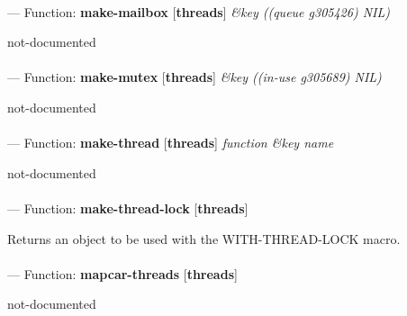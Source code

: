 \paragraph{}
\label{THREADS:MAKE-MAILBOX}
--- Function: \textbf{make-mailbox} [\textbf{threads}] \textit{\&key ((queue g305426) NIL)}

\begin{adjustwidth}{5em}{5em}
not-documented
\end{adjustwidth}

\paragraph{}
\label{THREADS:MAKE-MUTEX}
--- Function: \textbf{make-mutex} [\textbf{threads}] \textit{\&key ((in-use g305689) NIL)}

\begin{adjustwidth}{5em}{5em}
not-documented
\end{adjustwidth}

\paragraph{}
\label{THREADS:MAKE-THREAD}
--- Function: \textbf{make-thread} [\textbf{threads}] \textit{function \&key name}

\begin{adjustwidth}{5em}{5em}
not-documented
\end{adjustwidth}

\paragraph{}
\label{THREADS:MAKE-THREAD-LOCK}
--- Function: \textbf{make-thread-lock} [\textbf{threads}] \textit{}

\begin{adjustwidth}{5em}{5em}
Returns an object to be used with the WITH-THREAD-LOCK macro.
\end{adjustwidth}

\paragraph{}
\label{THREADS:MAPCAR-THREADS}
--- Function: \textbf{mapcar-threads} [\textbf{threads}] \textit{}

\begin{adjustwidth}{5em}{5em}
not-documented
\end{adjustwidth}

